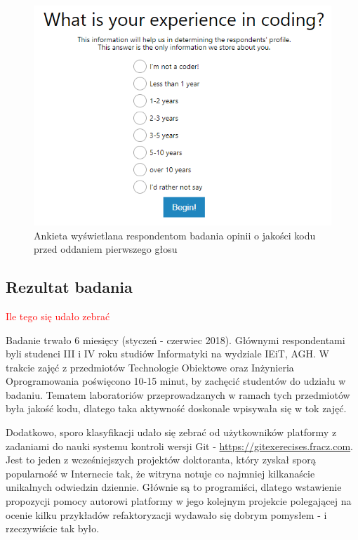 \documentclass[12pt]{report}
\begin{document}
\begin{figure}
\centering
\includegraphics[width=\textwidth]{impl/codefracz-ankieta.png}
\caption{Ankieta wyświetlana respondentom badania opinii o jakości kodu przed oddaniem pierwszego głosu}
\label{fig:impl:codefracz-ankieta}
\end{figure}

\subsection{Rezultat badania}
\textcolor{red}{Ile tego się udało zebrać}

Badanie trwało 6 miesięcy (styczeń - czerwiec 2018). Głównymi respondentami byli studenci III i IV roku studiów Informatyki na wydziale IEiT, AGH. W trakcie zajęć z przedmiotów Technologie Obiektowe oraz Inżynieria Oprogramowania poświęcono 10-15 minut, by zachęcić studentów do udziału w badaniu. Tematem laboratoriów przeprowadzanych w ramach tych przedmiotów była jakość kodu, dlatego taka aktywność doskonale wpisywała się w tok zajęć.

Dodatkowo, sporo klasyfikacji udało się zebrać od użytkowników platformy z zadaniami do nauki systemu kontroli wersji Git - \url{https://gitexerecises.fracz.com}. Jest to jeden z wcześniejszych projektów doktoranta, który zyskał sporą popularność w Internecie tak, że witryna notuje co najmniej kilkanaście unikalnych odwiedzin dziennie. Głównie są to programiści, dlatego wstawienie propozycji pomocy autorowi platformy w jego kolejnym projekcie polegającej na ocenie kilku przykładów refaktoryzacji wydawało się dobrym pomysłem - i rzeczywiście tak było.
\end{document}
